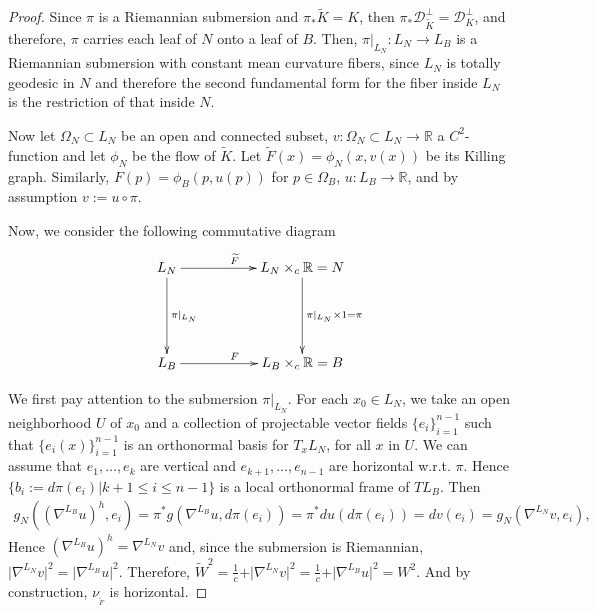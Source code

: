 \documentclass[12pt]{article}
\numberwithin{lemma}{section}
\newcommand{\R}{\mathbb{R}}
\newcommand{\grad}{\nabla}
\begin{document}
{\begin{proof}
Since $\pi$ is a Riemannian submersion and $\pi_*\widetilde{K}=K$, then  $\pi_*\mathcal{D}_{\widetilde{K}}^{\perp}=\mathcal{D}_{K}^{\perp}$, and therefore, $\pi$ carries each leaf of $N$ onto a leaf of $B$.  Then, $\pi|_{L_N}: L_N\rightarrow L_B$ is a Riemannian submersion with constant mean curvature fibers, since $L_N$ is totally geodesic in $N$ and therefore the second fundamental form for the fiber inside $L_N$ is the restriction of that inside $N$.





Now let $\Omega_N\subset L_N$ be an open and connected subset, $v:\Omega_N\subset L_N\rightarrow \R$ a $C^2$-function and let $\phi_N$ be the flow of $\widetilde{K}$.
 Let $\widetilde{F}(x)=\phi_N(x,v(x))$ be its Killing graph. Similarly, $F(p)=\phi_B(p,u(p))$ for $p\in \Omega_B$, $u:L_B\rightarrow\R$, and by assumption $v:=u\circ\pi$. 

Now,  we consider the following commutative diagram%
\[
\begin{xy}
 \xymatrix{
L_N\ar[rr]^{\widetilde{F}} \ar[dd]^{\pi|_{L_N}} & & L_N\times_{c} \mathbb{R}=N\ar[dd]^{\pi|_{L_N}\times 1=\pi}\\
 & &  \\
 L_B\ar[rr]^F& &  L_B\times_{c} \mathbb{R}=B 
}
\end{xy}
\]

We first pay attention to the submersion $\pi|_{L_N}$. For each $x_0\in L_N$, we take an open neighborhood $U$ of $x_0$ and a collection
of projectable vector fields $\{e_i\}_{i=1}^{n-1}$ such that $\{e_i(x)\}_{i=1}^{n-1}$ is an orthonormal basis for $T_xL_N$,
for all $x$ in $U$. We can assume that $e_1,\ldots,e_k$ are vertical and $e_{k+1},\ldots,e_{n-1}$ are horizontal w.r.t. $\pi$. Hence $\{b_i:=d\pi({e}_i) \vert k+1\leq i\leq n-1\} $ is a local orthonormal frame of $TL_B$. Then 
\begin{eqnarray*}
g_N((\grad^{L_B}u)^{h},e_i) =\pi^*g(\grad^{L_B}u,d\pi(e_i)) = \pi^*du(d\pi(e_i)) = dv(e_i)=g_N(\grad^{L_N}v,e_i),
\end{eqnarray*}
Hence $(\grad^{L_B}u)^h=\grad^{L_N}v$ and, since the submersion is Riemannian, $\vert\grad^{L_N} v\vert ^2 = \vert \grad^{L_B} u\vert^2$. Therefore, $\widetilde{W}^2=\frac{1}{c}+\vert\grad^{L_N} v\vert ^2 =\frac{1}{c}+ \vert \grad^{L_B}u\vert^2=W^2$.  And by construction, $\nu_{_{\widetilde{F}}}$ is horizontal.


\end{proof}}
\end{document}
